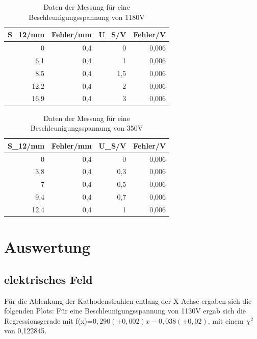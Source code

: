 \documentclass[12pt]{scrartcl}
\begin{document}
\begin{table}[htbp]
\caption{Daten der Messung für eine Beschleunigungsspannung von 1180V}
\begin{center}
\begin{tabular}{|r|r|r|r|}
\hline
\multicolumn{1}{|l|}{S\_12/mm} & \multicolumn{1}{l|}{Fehler/mm} & \multicolumn{1}{l|}{U\_S/V} & \multicolumn{1}{l|}{Fehler/V} \\ \hline
0 & 0,4 & 0 & 0,006 \\ \hline
6,1 & 0,4 & 1 & 0,006 \\ \hline
8,5 & 0,4 & 1,5 & 0,006 \\ \hline
12,2 & 0,4 & 2 & 0,006 \\ \hline
16,9 & 0,4 & 3 & 0,006 \\ \hline
\end{tabular}
\end{center}
\label{tab:materialeigenschaften}
\end{table}


\begin{table}[htbp]
\caption{Daten der Messung für eine Beschleunigungsspannung von 350V}
\begin{center}
\begin{tabular}{|r|r|r|r|}
\hline
\multicolumn{1}{|l|}{S\_12/mm} & \multicolumn{1}{l|}{Fehler/mm} & \multicolumn{1}{l|}{U\_S/V} & \multicolumn{1}{l|}{Fehler/V} \\ \hline
0 & 0,4 & 0 & 0,006 \\ \hline
3,8 & 0,4 & 0,3 & 0,006 \\ \hline
7 & 0,4 & 0,5 & 0,006 \\ \hline
9,4 & 0,4 & 0,7 & 0,006 \\ \hline
12,4 & 0,4 & 1 & 0,006 \\ \hline
\end{tabular}
\end{center}
\label{tab:materialeigenschaften}
\end{table}

\newpage

\section{Auswertung}
\subsection{elektrisches Feld}
Für die Ablenkung der Kathodenstrahlen entlang der X-Achse ergaben sich die folgenden Plots:
\newpage
Für eine Beschleunigungsspannung von 1130V ergab sich die Regressionsgerade mit f(x)=$0,290 (\pm 0,002 ) x  - 0,038 (\pm 0,02)$, mit einem $\chi^2$ von 0,122845.
\end{document}
